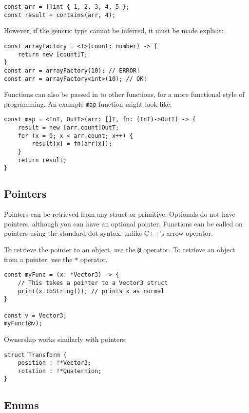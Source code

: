 \documentclass[12pt]{article}
\begin{document}
\begin{lstlisting}
const arr = []int { 1, 2, 3, 4, 5 };
const result = contains(arr, 4);
\end{lstlisting}

However, if the generic type cannot be inferred, it must be made explicit:

\begin{lstlisting}
const arrayFactory = <T>(count: number) -> {
	return new [count]T;
}
const arr = arrayFactory(10); // ERROR!
const arr = arrayFactory<int>(10); // OK!
\end{lstlisting}

Functions can also be passed in to other functions, for a more functional style of programming. An example \lstinline!map! function might look like:

\begin{lstlisting}
const map = <InT, OutT>(arr: []T, fn: (InT)->OutT) -> {
	result = new [arr.count]OutT;
	for (x = 0; x < arr.count; x++) {
		result[x] = fn(arr[x]);
	}
	return result;
}
\end{lstlisting}

\subsection{Pointers}

Pointers can be retrieved from any struct or primitive. Optionals do not have pointers, although you can have an optional pointer. Functions can be called on pointers using the standard dot syntax, unlike C++'s arrow operator.

To retrieve the pointer to an object, use the \lstinline!@! operator. To retrieve an object from a pointer, use the \lstinline!*! operator.

\begin{lstlisting}
const myFunc = (x: *Vector3) -> {
	// This takes a pointer to a Vector3 struct
	print(x.toString()); // prints x as normal
}

const v = Vector3;
myFunc(@v);
\end{lstlisting}

Ownership works similarly with pointers:

\begin{lstlisting}
struct Transform {
	position : !*Vector3;
	rotation : !*Quaternion;
}
\end{lstlisting}

\subsection{Enums}
\end{document}

